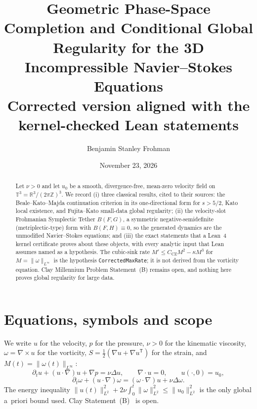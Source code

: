 \documentclass[11pt,reqno]{amsart}
\title[Geometric Phase-Space Completion and Conditional Regularity]{Geometric Phase-Space Completion and Conditional Global Regularity for the 3D Incompressible Navier--Stokes Equations\\[0.3em]\large Corrected version aligned with the kernel-checked Lean statements}
\author{Benjamin Stanley Frohman}
\date{November 23, 2026}
\theoremstyle{definition}
\newcommand{\R}{\mathbb{R}}\newcommand{\T}{\mathbb{T}^3}\newcommand{\Z}{\mathbb{Z}}
\newcommand{\lean}[1]{\texttt{#1}}
\newcommand{\norm}[1]{\lVert #1\rVert}
\begin{document}
\sloppy
\begin{abstract}
Let $\nu>0$ and let $u_0$ be a smooth, divergence-free, mean-zero velocity field on $\T=\R^3/(2\pi\Z)^3$. We record (i) three classical results, cited to their sources: the Beale--Kato--Majda continuation criterion in its one-directional form for $s>5/2$, Kato local existence, and Fujita--Kato small-data global regularity; (ii) the velocity-slot Frohmanian Symplectic Tether $B(F,G)$, a symmetric negative-semidefinite (metriplectic-type) form with $B(F,H)\equiv0$, so the generated dynamics are the unmodified Navier--Stokes equations; and (iii) the exact statements that a Lean~4 kernel certificate proves about these objects, with every analytic input that Lean assumes named as a hypothesis. The cubic-sink rate $M'\le C_{\mathrm{CZ}}M^2-\kappa M^3$ for $M=\norm{\omega}_{L^\infty}$ is the hypothesis \lean{CorrectedMaxRate}; it is not derived from the vorticity equation. Clay Millennium Problem Statement~(B) remains open, and nothing here proves global regularity for large data.
\end{abstract}
\maketitle
{}

\section{Equations, symbols and scope}
We write $u$ for the velocity, $p$ for the pressure, $\nu>0$ for the kinematic viscosity, $\omega=\nabla\times u$ for the vorticity, $S=\tfrac12(\nabla u+\nabla u^{\mathsf T})$ for the strain, and $M(t)=\norm{\omega(t)}_{L^\infty}$:
\[
\partial_tu+(u\cdot\nabla)u+\nabla p=\nu\Delta u,\qquad\nabla\cdot u=0,\qquad u(\cdot,0)=u_0,
\]
\[
\partial_t\omega+(u\cdot\nabla)\omega=(\omega\cdot\nabla)u+\nu\Delta\omega .
\]
The energy inequality $\norm{u(t)}_{L^2}^2+2\nu\int_0^t\norm{\omega}_{L^2}^2\le\norm{u_0}_{L^2}^2$ is the only global a~priori bound used. Clay Statement~(B)~\cite{Fefferman2000} is open.
\end{document}

